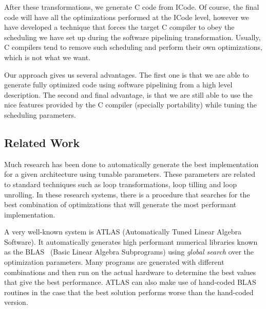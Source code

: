 \documentclass[10pt]{article}
\begin{document}
After these transformations, we generate C code from ICode. Of course, the final code will
have all the optimizations performed at the ICode level, however we have developed a technique that
forces the target C compiler to obey the scheduling we have set up during the software pipelining
transformation. Usually, C compilers tend to remove such scheduling and perform their own optimizations,
which is not what we want.

Our approach gives us several advantages. The first one is that we are able to generate fully optimized
code using software pipelining from a high level description. The second and final advantage, is that
we are still able to use the nice features provided by the C compiler (specially portability)
while tuning the scheduling parameters. 

\subsection{Related Work}

Much research has been done to automatically generate the best implementation
for a given architecture using tunable parameters. These parameters are
related to standard techniques such as loop transformations, loop tilling and loop unrolling.
In these research systems, there is a procedure that searches for the best combination of optimizations
that will generate the most performant implementation.

A very well-known system is ATLAS \cite{Whaley00automatedempirical} (Automatically Tuned Linear Algebra Software).
It automatically generates high performant numerical libraries known as the BLAS~\cite{Lawson:79} (Basic Linear Algebra Subprograms)
using \emph{global search} over the optimization parameters. Many programs are generated with different combinations
and then run on the actual hardware to determine the best values that give the best performance.
ATLAS can also make use of hand-coded BLAS routines in the case that the best solution performs worse than the hand-coded version.
\end{document}
